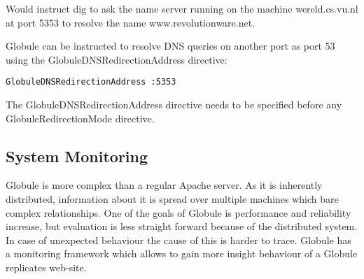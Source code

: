 \documentclass[10pt,a4paper]{article}
\makeatletter
\newenvironment{p}{\@open{P}{}}{\@close{P}}
\newenvironment{p}{}{\par}
\newcommand\subsectionbr{}
\makeatother
\begin{document}
\begin{p}
Would instruct dig to ask the name server running on the machine
wereld.cs.vu.nl at port 5353 to resolve the name www.revolutionware.net.
\end{p}

\begin{p}
Globule can be instructed to resolve DNS queries on another port as port 53
using the GlobuleDNSRedirectionAddress directive:
\end{p}

\begin{Verbatim}
GlobuleDNSRedirectionAddress :5353
\end{Verbatim}

\begin{p}
The GlobuleDNSRedirectionAddress directive needs to be specified before any
GlobuleRedirectionMode directive.
\end{p}

%


\newpage
\subsection{\label{sec:conf:monitoring}
  System Monitoring\subsectionbr}

\begin{p}
Globule is more complex than a regular Apache server.  As it is inherently
distributed, information about it is spread over multiple machines which bare
complex relationships.  One of the goals of Globule is performance and
reliability increase, but evaluation is less straight forward because of the
distributed system.  In case of unexpected behaviour the cause of this is
harder to trace.
Globule has a monitoring framework which allows to gain more insight behaviour
of a Globule replicates web-site.
\end{p}
\end{document}
